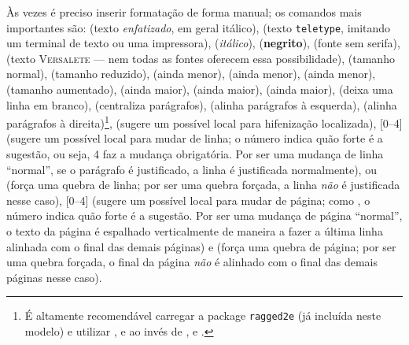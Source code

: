 Às vezes é preciso inserir formatação de forma manual; os comandos mais
importantes são:
 (texto \emph{enfatizado}, em geral itálico),
 (texto \texttt{teletype}, imitando um
                terminal de texto ou uma impressora),
 (\textit{itálico}),
 (\textbf{negrito}),
 (fonte \textsf{sem serifa}),
 (texto \textsc{Versalete} --- nem todas
                as fontes oferecem essa possibilidade),
 (tamanho normal),
 (tamanho reduzido),
 (ainda menor),
 (ainda menor),
 (ainda menor),
 (tamanho aumentado),
 (ainda maior),
 (ainda maior),
 (ainda maior),
 (deixa uma linha em branco),
 (centraliza parágrafos),
 (alinha parágrafos à esquerda),
 (alinha parágrafos à direita)\footnote{É
                             altamente recomendável carregar a package
                             \texttt{ragged2e} (já incluída neste modelo)
                             e utilizar ,  e
                              ao invés de ,
                              e .},
\ltxcmd{-} (sugere um possível local para hifenização localizada),
[0--4] (sugere um possível local para mudar de linha;
                         o número indica quão forte é a sugestão, ou
                         seja, 4 faz a mudança obrigatória. Por ser uma
                         mudança de linha ``normal'', se o parágrafo é
                         justificado, a linha é justificada normalmente),
 ou \cmd{\sla\sla} (força uma quebra de linha; por ser
                                   uma quebra forçada, a linha \emph{não}
                                   é justificada nesse caso),
[0--4] (sugere um possível local para mudar de página;
                         como , o número indica quão
                         forte é a sugestão. Por ser uma mudança de página
                         ``normal'', o texto da página é espalhado
                         verticalmente de maneira a fazer a última linha
                         alinhada com o final das demais páginas) e
 (força uma quebra de página; por ser uma quebra forçada,
                 o final da página \emph{não} é alinhado com o final das
                 demais páginas nesse caso).

